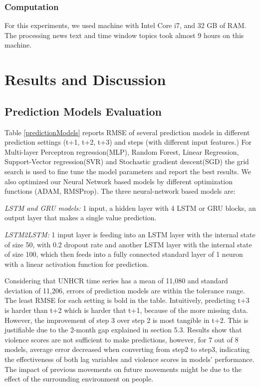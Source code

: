 \subsubsection{Computation} For this experiments, we used machine with Intel Core i7, and 32 GB of RAM. The processing news text and time window topics took almost 9 hours on this machine. 

\section{Results and Discussion}

\subsection{Prediction Models Evaluation}
Table \ref{predictionModels} reports RMSE of several prediction models in different prediction settings (t+1, t+2, t+3) and steps (with different input features.) For Multi-layer Perceptron regression(MLP), Random Forest, Linear Regression, Support-Vector regression(SVR) and Stochastic gradient descent(SGD) the grid search is used to fine tune the model parameters and report the best results. We also optimized our Neural Network based models by different optimization functions (ADAM, RMSProp). The three neural-network based models are:

\textit{LSTM and GRU models:} 1 input, a hidden layer with 4 LSTM or GRU blocks, an output layer that makes a single value prediction.

\textit{LSTM2LSTM:} 1 input layer is feeding into an LSTM layer with the internal state of size 50, with 0.2 dropout rate and another LSTM layer with the internal state of size 100, which then feeds into a fully connected standard layer of 1 neuron with a linear activation function for prediction.

Considering that UNHCR time series has a mean of 11,080 and standard deviation of 11,206, errors of prediction models are within the tolerance range. The least RMSE for each setting is bold in the table.
Intuitively, predicting t+3 is harder than t+2 which is harder that t+1, because of the more missing data. However, the improvement of step 3 over step 2 is most tangible in t+2. This is justifiable due to the 2-month gap explained in section 5.3. Results show that violence scores are not sufficient to make predictions, however, for 7 out of 8 models, average error decreased when converting from step2 to step3, indicating the effectiveness of both lag variables and violence scores in models' performance. The impact of previous movements on future movements might be due to the effect of the surrounding environment on people.

